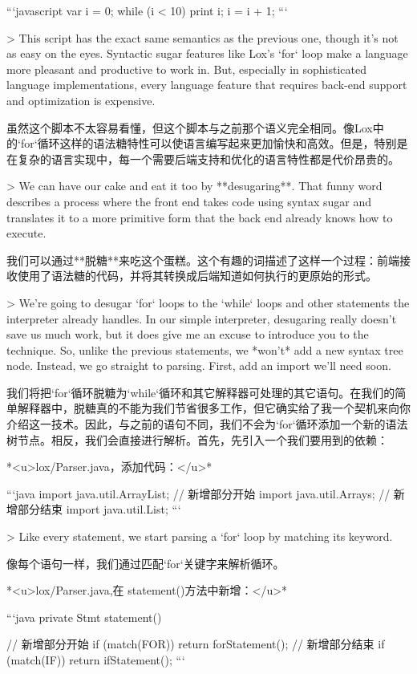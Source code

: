 \documentclass[cn,11pt,chinese]{elegantbook}
\begin{document}
{{{{```javascript
{
  var i = 0;
  while (i < 10) {
    print i;
    i = i + 1;
  }
}
```

> This script has the exact same semantics as the previous one, though it’s not as easy on the eyes. Syntactic sugar features like Lox’s `for` loop make a language more pleasant and productive to work in. But, especially in sophisticated language implementations, every language feature that requires back-end support and optimization is expensive.

虽然这个脚本不太容易看懂，但这个脚本与之前那个语义完全相同。像Lox中的`for`循环这样的语法糖特性可以使语言编写起来更加愉快和高效。但是，特别是在复杂的语言实现中，每一个需要后端支持和优化的语言特性都是代价昂贵的。

> We can have our cake and eat it too by **desugaring**. That funny word describes a process where the front end takes code using syntax sugar and translates it to a more primitive form that the back end already knows how to execute.

我们可以通过**脱糖**来吃这个蛋糕。这个有趣的词描述了这样一个过程：前端接收使用了语法糖的代码，并将其转换成后端知道如何执行的更原始的形式。

> We’re going to desugar `for` loops to the `while` loops and other statements the interpreter already handles. In our simple interpreter, desugaring really doesn’t save us much work, but it does give me an excuse to introduce you to the technique. So, unlike the previous statements, we *won’t* add a new syntax tree node. Instead, we go straight to parsing. First, add an import we’ll need soon.

我们将把`for`循环脱糖为`while`循环和其它解释器可处理的其它语句。在我们的简单解释器中，脱糖真的不能为我们节省很多工作，但它确实给了我一个契机来向你介绍这一技术。因此，与之前的语句不同，我们不会为`for`循环添加一个新的语法树节点。相反，我们会直接进行解析。首先，先引入一个我们要用到的依赖：

*<u>lox/Parser.java，添加代码：</u>*

```java
import java.util.ArrayList;
// 新增部分开始
import java.util.Arrays;
// 新增部分结束
import java.util.List;
```

> Like every statement, we start parsing a `for` loop by matching its keyword.

像每个语句一样，我们通过匹配`for`关键字来解析循环。

*<u>lox/Parser.java,在 statement()方法中新增：</u>*

```java
  private Stmt statement() {
    // 新增部分开始
    if (match(FOR)) return forStatement();
    // 新增部分结束
    if (match(IF)) return ifStatement();
```

}}}}}
\end{document}
